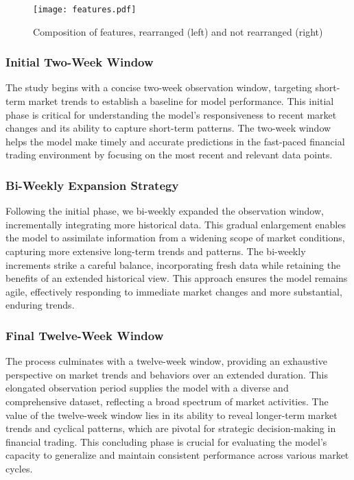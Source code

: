 \begin{figure*}[htbp]
    \centering
    \texttt{[image: features.pdf]}
    \caption{Composition of features, rearranged (left) and not rearranged (right)}
    \label{fig:journal_paper_features_old_data_not_rearranged}
\end{figure*}

\subsubsection{Initial Two-Week Window}

The study begins with a concise two-week observation window, targeting short-term market trends to establish a baseline for model performance. This initial phase is critical for understanding the model's responsiveness to recent market changes and its ability to capture short-term patterns. The two-week window helps the model make timely and accurate predictions in the fast-paced financial trading environment by focusing on the most recent and relevant data points.

\subsubsection{Bi-Weekly Expansion Strategy}

Following the initial phase, we bi-weekly expanded the observation window, incrementally integrating more historical data. This gradual enlargement enables the model to assimilate information from a widening scope of market conditions, capturing more extensive long-term trends and patterns. The bi-weekly increments strike a careful balance, incorporating fresh data while retaining the benefits of an extended historical view. This approach ensures the model remains agile, effectively responding to immediate market changes and more substantial, enduring trends.

\subsubsection{Final Twelve-Week Window}

The process culminates with a twelve-week window, providing an exhaustive perspective on market trends and behaviors over an extended duration. This elongated observation period supplies the model with a diverse and comprehensive dataset, reflecting a broad spectrum of market activities. The value of the twelve-week window lies in its ability to reveal longer-term market trends and cyclical patterns, which are pivotal for strategic decision-making in financial trading. This concluding phase is crucial for evaluating the model's capacity to generalize and maintain consistent performance across various market cycles.

